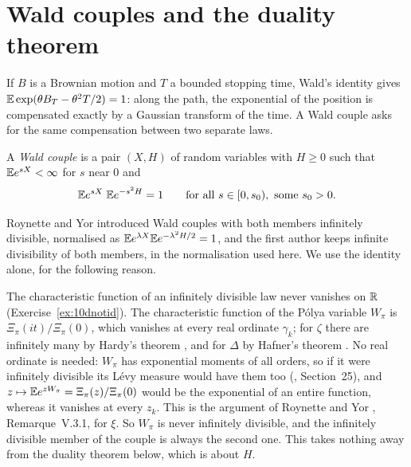 \section{Wald couples and the duality theorem}

If $B$ is a Brownian motion and $T$ a bounded stopping time, Wald's identity gives $\mathbb{E}\exp(\theta B_T-\theta^2T/2) = 1$: along the path, the exponential of the position is compensated exactly by a Gaussian transform of the time. A Wald couple asks for the same compensation between two separate laws.

\begin{definition}\label{def:10dwald}
A \emph{Wald couple} is a pair $(X,H)$ of random variables with $H\ge0$ such that $\mathbb{E} e^{sX}<\infty$ for $s$ near $0$ and
\[
\mathbb{E} e^{sX}\;\mathbb{E} e^{-s^2H} = 1\qquad\text{for all }s\in[0,s_0),\ \text{some }s_0>0 .
\]
\end{definition}

Roynette and Yor \cite{roynetteyor2005} introduced Wald couples with both members infinitely divisible, normalised as $\mathbb{E} e^{\lambda X}\mathbb{E} e^{-\lambda^2H/2}=1$, and the first author \cite{polson2018vdp} keeps infinite divisibility of both members, in the normalisation used here. We use the identity alone, for the following reason.

\begin{remark}\label{rem:10dnotid}
The characteristic function of an infinitely divisible law never vanishes on $\mathbb{R}$ (Exercise~\ref{ex:10dnotid}). The characteristic function of the P\'olya variable $W_\pi$ is $\Xi_\pi(it)/\Xi_\pi(0)$, which vanishes at every real ordinate $\gamma_k$; for $\zeta$ there are infinitely many by Hardy's theorem \cite{hardy1914}, and for $\Delta$ by Hafner's theorem \cite{hafner1983}. No real ordinate is needed: $W_\pi$ has exponential moments of all orders, so if it were infinitely divisible its L\'evy measure would have them too (\cite{sato1999}, Section~25), and $z\mapsto\mathbb{E} e^{zW_\pi} = \Xi_\pi(z)/\Xi_\pi(0)$ would be the exponential of an entire function, whereas it vanishes at every $z_k$. This is the argument of Roynette and Yor \cite{roynetteyor2005}, Remarque~V.3.1, for $\xi$. So $W_\pi$ is never infinitely divisible, and the infinitely divisible member of the couple is always the second one. This takes nothing away from the duality theorem below, which is about $H$.
\end{remark}

